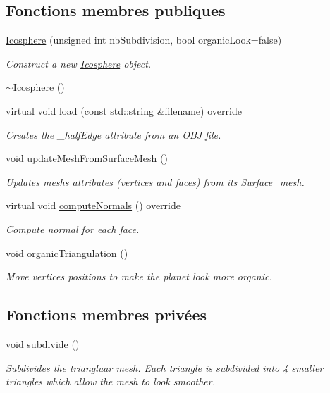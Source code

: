 \subsection*{Fonctions membres publiques}
\begin{DoxyCompactItemize}
\item 
\hyperlink{class_icosphere_a6051bb79f73f5aecb95074118fb019b3}{Icosphere} (unsigned int nb\+Subdivision, bool organic\+Look=false)
\begin{DoxyCompactList}\small\item\em Construct a new \hyperlink{class_icosphere}{Icosphere} object. \end{DoxyCompactList}\item 
\hyperlink{class_icosphere_ac9473c8c8d6085b6370d95772b898a45}{$\sim$\+Icosphere} ()
\item 
virtual void \hyperlink{class_icosphere_a72c3cc3d95cf508a623fe336cbbab350}{load} (const std\+::string \&filename) override
\begin{DoxyCompactList}\small\item\em Creates the \+\_\+half\+Edge attribute from an O\+BJ file. \end{DoxyCompactList}\item 
void \hyperlink{class_icosphere_a38645b095ea6895c2aa5bbff7d8edf20}{update\+Mesh\+From\+Surface\+Mesh} ()
\begin{DoxyCompactList}\small\item\em Updates mesh\textquotesingle{}s attributes (vertices and faces) from its Surface\+\_\+mesh. \end{DoxyCompactList}\item 
virtual void \hyperlink{class_icosphere_af7d6c8c60248794f6a6c382dc5f98a24}{compute\+Normals} () override
\begin{DoxyCompactList}\small\item\em Compute normal for each face. \end{DoxyCompactList}\item 
void \hyperlink{class_icosphere_ab3470de718fee359ef4691e0c2ee987a}{organic\+Triangulation} ()
\begin{DoxyCompactList}\small\item\em Move vertices positions to make the planet look more organic. \end{DoxyCompactList}\end{DoxyCompactItemize}
\subsection*{Fonctions membres privées}
\begin{DoxyCompactItemize}
\item 
void \hyperlink{class_icosphere_a1086e13d1300ed79bf201d2570eb7ebe}{subdivide} ()
\begin{DoxyCompactList}\small\item\em Subdivides the triangluar mesh. Each triangle is subdivided into 4 smaller triangles which allow the mesh to look smoother. \end{DoxyCompactList}\end{DoxyCompactItemize}
